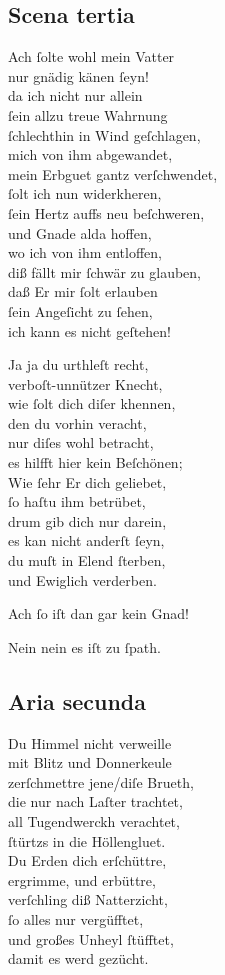 \documentclass{ees}
\newenvironment{lyrics}[1]{%
  \subsection{#1}\nopagebreak%
  \begin{lyricslist}%
  \let\voice\item%
}{%
  \end{lyricslist}%
}
\newcommand\voiceSohn{\voice[Sohn]}
\newcommand\voiceGerechtigkeit{\voice[Gerecht.]}
\begin{document}
\begin{lyrics}{Scena tertia}
  \voiceSohn
  Ach ſolte wohl mein Vatter\\
  nur gnädig känen ſeyn!\\
  da ich nicht nur allein\\
  ſein allzu treue Wahrnung\\
  ſchlechthin in Wind geſchlagen,\\
  mich von ihm abgewandet,\\
  mein Erbguet gantz verſchwendet,\\
  ſolt ich nun widerkheren,\\
  ſein Hertz auffs neu beſchweren,\\
  und Gnade alda hoffen,\\
  wo ich von ihm entloffen,\\
  diß fällt mir ſchwär zu glauben,\\
  daß Er mir ſolt erlauben\\
  ſein Angeſicht zu ſehen,\\
  ich kann es nicht geſtehen!

  \voiceGerechtigkeit
  Ja ja du urthleſt recht,\\
  verboſt-unnützer Knecht,\\
  wie ſolt dich diſer khennen,\\
  den du vorhin veracht,\\
  nur diſes wohl betracht,\\
  es hilfft hier kein Beſchönen;\\
  Wie ſehr Er dich geliebet,\\
  ſo haſtu ihm betrübet,\\
  drum gib dich nur darein,\\
  es kan nicht anderſt ſeyn,\\
  du muſt in Elend ſterben,\\
  und Ewiglich verderben.

  \voiceSohn
  Ach ſo iſt dan gar kein Gnad!

  \voiceGerechtigkeit
  Nein nein es iſt zu ſpath.
\end{lyrics}

\begin{lyrics}{Aria secunda}
  \voiceGerechtigkeit
  Du Himmel nicht verweille\\
  mit Blitz und Donnerkeule\\
  zerſchmettre jene/diſe Brueth,\\
  die nur nach Laſter trachtet,\\
  all Tugendwerckh verachtet,\\
  ſtürtzs in die Höllengluet.\\[1ex]
  Du Erden dich erſchüttre,\\
  ergrimme, und erbüttre,\\
  verſchling diß Natterzicht,\\
  ſo alles nur vergüfftet,\\
  und großes Unheyl ſtüfftet,\\
  damit es werd gezücht.
\end{lyrics}
\end{document}
